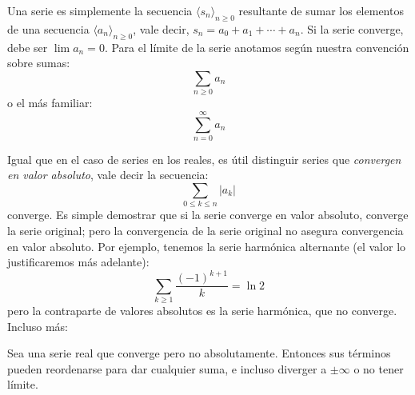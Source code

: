   Una serie es simplemente
  la secuencia \(\langle s_n \rangle_{n \ge 0}\)
  resultante de sumar los elementos
  de una secuencia \(\langle a_n \rangle_{n \ge 0}\),
  vale decir,
  \(s_n = a_0 + a_1 + \dotsb + a_n\).
  Si la serie converge,
  debe ser \(\lim a_n = 0\).
  Para el límite de la serie
  anotamos según nuestra convención sobre sumas:
  \begin{equation*}
    \sum_{n \ge 0} a_n
  \end{equation*}
  o el más familiar:
  \begin{equation*}
    \sum_{n = 0}^\infty a_n
  \end{equation*}

  Igual que en el caso de series en los reales,
  es útil distinguir series
  que \emph{convergen en valor absoluto},%
  vale decir la secuencia:
  \begin{equation*}
    \sum_{0 \le k \le n} \lvert a_k \rvert
  \end{equation*}
  converge.
  Es simple demostrar que si la serie converge en valor absoluto,
  converge la serie original;
  pero la convergencia de la serie original
  no asegura convergencia en valor absoluto.
  Por ejemplo,
  tenemos la serie harmónica alternante
  (el valor lo justificaremos más adelante):
  \begin{equation}
    \label{eq:alternating-harmonic-series}
    \sum_{k \ge 1} \frac{(-1)^{k + 1}}{k}
      = \ln 2
  \end{equation}
  pero la contraparte de valores absolutos es la serie harmónica,
  que no converge.
  Incluso más:
  \begin{theorem}
    \label{theo:Riemann-rearrangement}
    Sea una serie real que converge pero no absolutamente.
    Entonces sus términos
    pueden reordenarse para dar cualquier suma,
    e incluso diverger a \(\pm \infty\)
    o no tener límite.
  \end{theorem}
